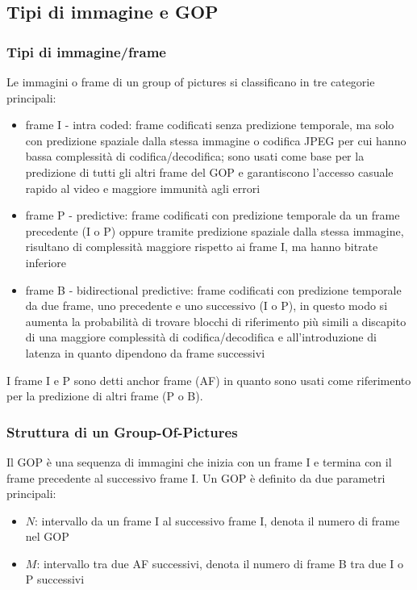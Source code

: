 \subsection{Tipi di immagine e GOP}
\subsubsection*{Tipi di immagine/frame}
Le immagini o frame di un group of pictures si classificano in tre categorie principali:
\begin{itemize}
	\item frame I - intra coded: frame codificati senza predizione temporale, ma solo con predizione spaziale dalla stessa
	immagine o codifica JPEG per cui hanno bassa complessità di codifica/decodifica; sono usati come base per la predizione di
	tutti gli altri frame del GOP e garantiscono l'accesso casuale rapido al video e maggiore immunità agli errori
	\item frame P - predictive: frame codificati con predizione temporale da un frame precedente (I o P) oppure tramite
	predizione spaziale dalla stessa immagine, risultano di complessità maggiore rispetto ai frame I, ma hanno bitrate inferiore
	\item frame B - bidirectional predictive: frame codificati con predizione temporale da due frame, uno precedente e uno
	successivo (I o P), in questo modo si aumenta la probabilità di trovare blocchi di riferimento più simili a discapito
	di una maggiore complessità di codifica/decodifica e all'introduzione di latenza in quanto dipendono da frame successivi
\end{itemize}
I frame I e P sono detti anchor frame (AF) in quanto sono usati come riferimento per la predizione di altri frame (P o B).

\subsubsection*{Struttura di un Group-Of-Pictures}
Il GOP è una sequenza di immagini che inizia con un frame I e termina con il frame precedente al successivo frame I.
Un GOP è definito da due parametri principali:
\begin{itemize}
	\item \(N\): intervallo da un frame I al successivo frame I, denota il numero di frame nel GOP
	\item \(M\): intervallo tra due AF successivi, denota il numero di frame B tra due I o P successivi
\end{itemize}

